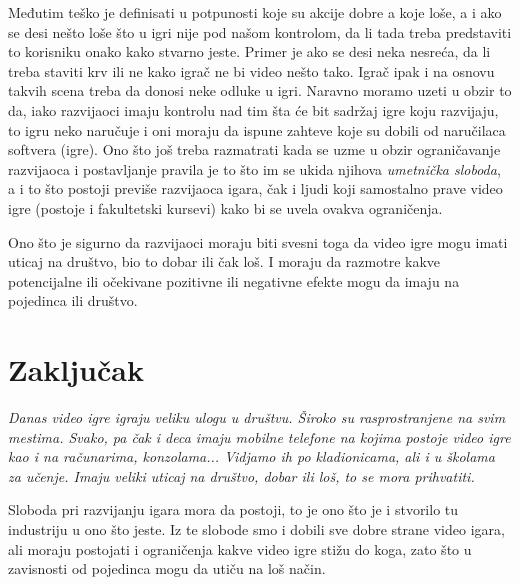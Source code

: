 \documentclass[a4paper]{article}
\begin{document}
Međutim teško je definisati u potpunosti koje su akcije dobre a koje loše, a i ako se desi nešto loše što u igri
nije pod našom kontrolom, da li tada treba predstaviti to korisniku onako kako stvarno jeste. Primer je ako se 
desi neka nesreća, da li treba staviti krv ili ne kako igrač ne bi video nešto tako. Igrač ipak i na osnovu takvih 
scena treba da donosi neke odluke u igri. Naravno moramo uzeti u obzir to da, iako razvijaoci imaju kontrolu nad
tim šta će bit sadržaj igre koju razvijaju, to igru neko naručuje i oni moraju da ispune zahteve koje su dobili od
naručilaca softvera (igre). Ono što još treba razmatrati kada se uzme u obzir ograničavanje razvijaoca i postavljanje pravila
je to što im se ukida njihova {\em umetnička sloboda}, a i to što postoji previše razvijaoca igara, čak i ljudi koji samostalno prave video igre
(postoje i fakultetski kursevi) kako bi se uvela ovakva ograničenja.

Ono što je sigurno da razvijaoci moraju biti svesni toga da video igre mogu imati uticaj na društvo, bio to
dobar ili čak loš. I moraju da razmotre kakve potencijalne ili očekivane pozitivne ili negativne efekte mogu da
imaju na pojedinca ili društvo.
\newpage

\section{Zaključak}
\label{sec:zakljucak}
{\em
Danas video igre igraju veliku ulogu u društvu. Široko su rasprostranjene na svim mestima. Svako, pa čak i deca
imaju mobilne telefone na kojima postoje video igre kao i na računarima, konzolama... Vidjamo ih po kladionicama, ali i u školama za učenje.
Imaju veliki uticaj na društvo, dobar ili loš, to se mora prihvatiti.

Sloboda pri razvijanju igara mora da postoji, to je ono što je i stvorilo tu industriju u ono što jeste. Iz te slobode
smo i dobili sve dobre strane video igara, ali moraju postojati i ograničenja kakve video igre stižu do koga, zato što
u zavisnosti od pojedinca mogu da utiču na loš način.
}
\newpage

\appendix

\end{document}
